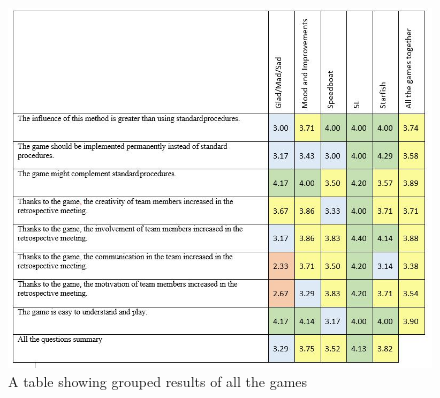 \begin{figure}[!htbp]
\caption{A table showing grouped results of all the games}
\label{fig:groupedResults}
\centering
\includegraphics[width=1\textwidth]{charts/groupedResults}
\end{figure}